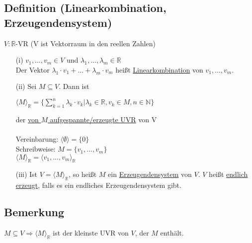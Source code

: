 \documentclass[12pt,titlepage, pdf]{article}
\newcommand{\R}{\mathds{R}}
\newcommand{\uline}[1]{\underline{#1}}
\renewcommand{\>}{\rightarrow}
\renewcommand{\*}{\cdot}
\begin{document}
	\subsection{Definition (Linearkombination, Erzeugendensystem)}
	$V: \R$-VR (V ist Vektorraum in den reellen Zahlen) \\
	\begin{itemize}
		\item[(i)] $v_1, ... , v_m \in V$ und $\lambda_1,...,\lambda_m \in \R$\\ Der Vektor $\lambda_1 \* v_1 + ... + \lambda_m \* v_m$ heißt \uline{Linearkombination} von $v_1,...,v_m$.
		\item[(ii)] Sei $M \subseteq V$. Dann ist
		\begin{center}
			$\langle M \rangle_{\R} = \{ \sum_{k = 1}^{n} \lambda_k \cdot v_k \vert \lambda_k \in \R, v_k \in M, n \in \mathds{N}\}$
		\end{center}
		der \underline{von $M$ aufgespannte/erzeugte UVR} von V \\
		\\
		Vereinbarung: $\langle \emptyset \rangle = \{0\}$\\
		Schreibweise: $M = \{v_1,...,v_m\}$\\
		\noindent\hspace*{22mm}$\langle M \rangle_{\R} = \langle v_1,..., v_m\rangle_{\R} $
		\item[(iii)]
		Ist $V = \langle M \rangle_{\R}$, so heißt $M$ ein \uline{Erzeugendensystem} von $V$. $V$ heißt \uline{endlich erzeugt}, falls es ein endliches Erzeugendensystem gibt.
	\end{itemize}
	\subsection{Bemerkung}
	$M \subseteq V \Rightarrow \langle M \rangle_{\R}$ ist der kleinste UVR von $V$, der $M$ enthält.\\
\end{document}
